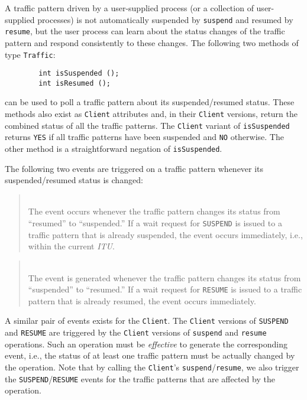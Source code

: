A traffic pattern driven by a user-supplied process (or a collection of
user-supplied processes) is not automatically suspended by {\tt suspend}
and resumed by {\tt resume}, but the user process can learn about the
status changes of the traffic pattern and respond consistently to these
changes.
The following two methods of type {\tt Traffic}:
\begin{verbatim}
        int isSuspended ();
        int isResumed ();
\end{verbatim}
can be used to poll a traffic pattern about its suspended/resumed status.
These methods also exist as {\tt Client} attributes and, in their {\tt Client}
versions, return the combined status of all the traffic patterns.
The {\tt Client} variant of {\tt isSuspended} returns {\tt YES} if all
traffic patterns have been suspended and {\tt NO} otherwise.
The other method is a straightforward negation of {\tt isSuspended}.

The following two events are triggered on a traffic pattern whenever its 
suspended/resumed status is changed:

\medskip

\begin{quote}
\noindent{}\\ \hspace{0in}
The event occurs whenever the traffic pattern changes its status from
``resumed'' to ``suspended.''
If a wait request for {\tt SUSPEND} is issued to a traffic pattern that is
already suspended, the event occurs immediately, i.e., within the current
{\em ITU}.
\end{quote}

\begin{quote}
\noindent{}\\ \hspace{0in}
The event is generated whenever the traffic pattern changes its status from
``suspended'' to ``resumed.''
If a wait request for {\tt RESUME} is issued to a traffic pattern that is
already resumed, the event occurs immediately.
\end{quote}\medskip

A similar pair of events exists for the {\tt Client}.
The {\tt Client} versions of {\tt SUSPEND} and {\tt RESUME} are triggered
by the {\tt Client} versions of {\tt suspend} and {\tt resume} operations.
Such an operation must be {\em effective\/} to generate the corresponding
event, i.e., the status of at least one traffic pattern must be actually
changed by the operation.
Note that by calling the {\tt Client}'s {\tt suspend}/{\tt resume}, we also
trigger the {\tt SUSPEND}/{\tt RESUME} events for the traffic patterns
that are affected by the operation.


